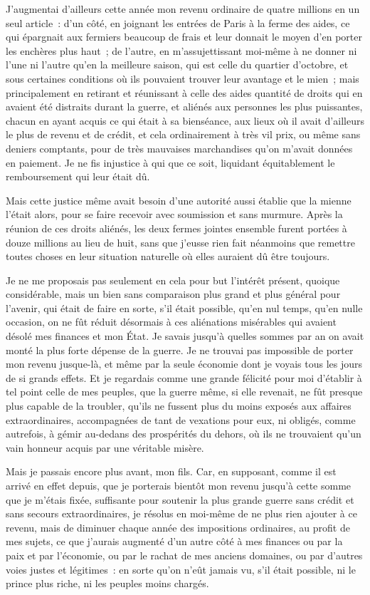 \documentclass[french,twoside]{book} %
\begin{document}
J’augmentai d’ailleurs cette année mon revenu ordinaire de quatre millions en un seul article : d’un côté, en joignant les entrées de Paris à la ferme des aides, ce qui épargnait aux fermiers beaucoup de frais et leur donnait le moyen d’en porter les enchères plus haut ; de l’autre, en m’assujettissant moi-même à ne donner ni l’une ni l’autre qu’en la meilleure saison, qui est celle du quartier d’octobre, et sous certaines conditions où ils pouvaient trouver leur avantage et le mien ; mais principalement en retirant et réunissant à celle des aides quantité de droits qui en avaient été distraits durant la guerre, et aliénés aux personnes les plus puissantes, chacun en ayant acquis ce qui était à sa bienséance, aux lieux où il avait d’ailleurs le plus de revenu et de crédit, et cela ordinairement à très vil prix, ou même sans deniers comptants, pour de très mauvaises marchandises qu’on m’avait données en paiement. Je ne fis injustice à qui que ce soit, liquidant équitablement le remboursement qui leur était dû.\par
Mais cette justice même avait besoin d’une autorité aussi établie que la mienne l’était alors, pour se faire recevoir avec soumission et sans murmure. Après la réunion de ces droits aliénés, les deux fermes jointes ensemble furent portées à douze millions au lieu de huit, sans que j’eusse rien fait néanmoins que remettre toutes choses en leur situation naturelle où elles auraient dû être toujours.\par
Je ne me proposais pas seulement en cela pour but l’intérêt présent, quoique considérable, mais un bien sans comparaison plus grand et plus général pour l’avenir, qui était de faire en sorte, s’il était possible, qu’en nul temps, qu’en nulle occasion, on ne fût réduit désormais à ces aliénations misérables qui avaient désolé mes finances et mon État. Je savais jusqu’à quelles sommes par an on avait monté la plus forte dépense de la guerre. Je ne trouvai pas impossible de porter mon revenu jusque-là, et même par la seule économie dont je voyais tous les jours de si grands effets. Et je regardais comme une grande félicité pour moi d’établir à tel point celle de mes peuples, que la guerre même, si elle revenait, ne fût presque plus capable de la troubler, qu’ils ne fussent plus du moins exposés aux affaires extraordinaires, accompagnées de tant de vexations pour eux, ni obligés, comme autrefois, à gémir au-dedans des prospérités du dehors, où ils ne trouvaient qu’un vain honneur acquis par une véritable misère.\par
Mais je passais encore plus avant, mon fils. Car, en supposant, comme il est arrivé en effet depuis, que je porterais bientôt mon revenu jusqu’à cette somme que je m’étais fixée, suffisante pour soutenir la plus grande guerre sans crédit et sans secours extraordinaires, je résolus en moi-même de ne plus rien ajouter à ce revenu, mais de diminuer chaque année des impositions ordinaires, au profit de mes sujets, ce que j’aurais augmenté d’un autre côté à mes finances ou par la paix et par l’économie, ou par le rachat de mes anciens domaines, ou par d’autres voies justes et légitimes : en sorte qu’on n’eût jamais vu, s’il était possible, ni le prince plus riche, ni les peuples moins chargés.\par
\end{document}

